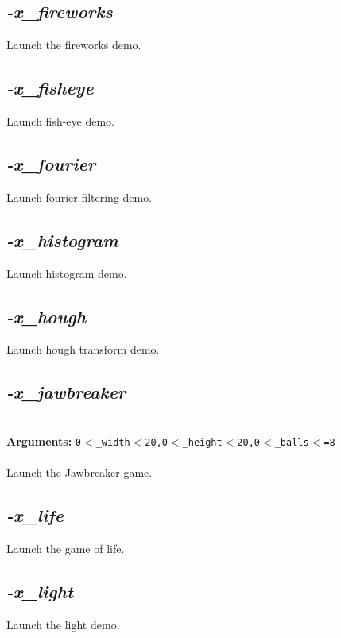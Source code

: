 \documentclass[a4paper,11pt,twoside]{book}
\begin{document}
\subsection{\emph{-x\_fireworks} }\vspace*{-0.5em}
Launch the fireworks demo.


\subsection{\emph{-x\_fisheye} }\vspace*{-0.5em}
Launch fish-eye demo.


\subsection{\emph{-x\_fourier} }\vspace*{-0.5em}
Launch fourier filtering demo.


\subsection{\emph{-x\_histogram} }\vspace*{-0.5em}
Launch histogram demo.


\subsection{\emph{-x\_hough} }\vspace*{-0.5em}
Launch hough transform demo.


\subsection{\emph{-x\_jawbreaker} }\vspace*{-0.5em}
~\\\textbf{Arguments: } 
{\small \texttt{0$<$\_width$<$20,0$<$\_height$<$20,0$<$\_balls$<$=8}}\\~\\
Launch the Jawbreaker game.


\subsection{\emph{-x\_life} }\vspace*{-0.5em}
Launch the game of life.


\subsection{\emph{-x\_light} }\vspace*{-0.5em}
Launch the light demo.
\end{document}
